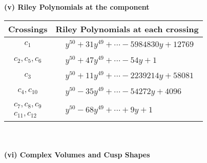 \documentclass[1p]{elsarticle_modified}
\theoremstyle{definition}
\begin{document}
\newpage\renewcommand{\arraystretch}{1}
\flushleft \textbf{(v) Riley Polynomials at the component}\newline \\
\begin{tabular}{m{50pt}|m{274pt}}
Crossings & \hspace{64pt}Riley Polynomials at each crossing \\
\hline $$\begin{aligned}c_{1}\end{aligned}$$&$\begin{aligned}
&y^{50}+31 y^{49}+\cdots-5984830 y+12769
\end{aligned}$\\
\hline $$\begin{aligned}c_{2},c_{5},c_{6}\end{aligned}$$&$\begin{aligned}
&y^{50}+47 y^{49}+\cdots-54 y+1
\end{aligned}$\\
\hline $$\begin{aligned}c_{3}\end{aligned}$$&$\begin{aligned}
&y^{50}+11 y^{49}+\cdots-2239214 y+58081
\end{aligned}$\\
\hline $$\begin{aligned}c_{4},c_{10}\end{aligned}$$&$\begin{aligned}
&y^{50}-35 y^{49}+\cdots-54272 y+4096
\end{aligned}$\\
\hline $$\begin{aligned}c_{7},c_{8},c_{9}\\c_{11},c_{12}\end{aligned}$$&$\begin{aligned}
&y^{50}-68 y^{49}+\cdots+9 y+1
\end{aligned}$\\
\hline
\end{tabular}\\~\\
\newpage\flushleft \textbf{(vi) Complex Volumes and Cusp Shapes}
\end{document}
